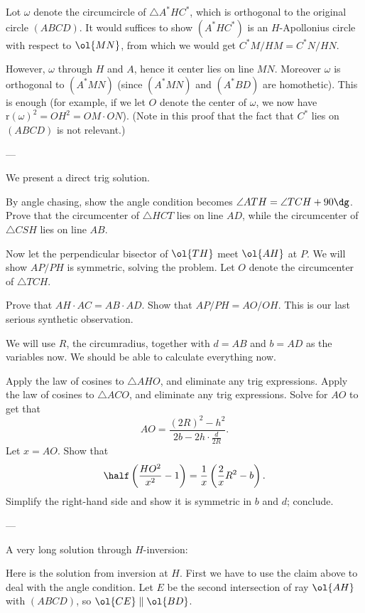 Lot $\omega$ denote the circumcircle of $\triangle A^\ast H C^\ast$,
which is orthogonal to the original circle $(ABCD)$.
It would suffices to show $(A^\ast H C^\ast)$
is an $H$-Apollonius circle with respect to $\ol{MN}$,
from which we would get $C^\ast M / H M = C^\ast N / H N$.

However, $\omega$ through $H$ and $A$,
hence it center lies on line $MN$.
Moreover $\omega$ is orthogonal to $(A^\ast MN)$
(since $(A^\ast MN)$ and $(A^\ast BD)$ are homothetic).
This is enough (for example, if we let $O$ denote the center of $\omega$,
we now have $\mathrm{r}(\omega)^2 = OH^2 = OM \cdot ON$).
(Note in this proof that the fact that $C^\ast$ lies on $(ABCD)$
is not relevant.)


---

We present a direct trig solution.
\begin{walk}
  \ii By angle chasing, show the angle condition
  becomes $\angle ATH = \angle TCH  + 90\dg$.
  \ii Prove that the circumcenter of $\triangle HCT$ lies on line $AD$,
  while the circumcenter of $\triangle CSH$ lies on line $AB$.
\end{walk}
Now let the perpendicular bisector of $\ol{TH}$
meet $\ol{AH}$ at $P$.
We will show $AP/PH$ is symmetric, solving the problem.
Let $O$ denote the circumcenter of $\triangle TCH$.
\begin{walk}[resume]
  \ii Prove that $AH \cdot AC = AB \cdot AD$.
  \ii Show that $AP/PH = AO/OH$.
  This is our last serious synthetic observation.
\end{walk}
We will use $R$, the circumradius,
together with $d = AB$ and $b = AD$ as the variables now.
We should be able to calculate everything now.
\begin{walk}[resume]
  \ii Apply the law of cosines to $\triangle AHO$,
  and eliminate any trig expressions.
  \ii Apply the law of cosines to $\triangle ACO$,
  and eliminate any trig expressions.
  \ii Solve for $AO$ to get that
  \[ AO = \frac{(2R)^2-h^2}{2b - 2h \cdot \frac{d}{2R}}. \]
  \ii Let $x = AO$. Show that
  \[ \half \left( \frac{HO^2}{x^2} - 1 \right)
    = \frac 1x \left( \frac 2x R^2 - b \right). \]
  \ii Simplify the right-hand side and show it is symmetric
  in $b$ and $d$; conclude.
\end{walk}

---

A very long solution through $H$-inversion:

Here is the solution from inversion at $H$.
First we have to use the claim above to deal with the angle condition.
Let $E$ be the second intersection of ray $\ol{AH}$ with $(ABCD)$,
so $\ol{CE} \parallel \ol{BD}$.

